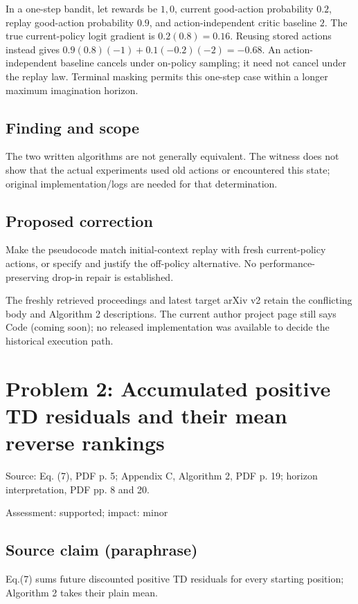 \documentclass[11pt]{article}
\begin{document}
In a one-step bandit, let rewards be \(1,0\), current good-action probability \(0.2\), replay good-action probability \(0.9\), and action-independent critic baseline \(2\). The true current-policy logit gradient is \(0.2(0.8)=0.16\). Reusing stored actions instead gives \(0.9(0.8)(-1)+0.1(-0.2)(-2)=-0.68\). An action-independent baseline cancels under on-policy sampling; it need not cancel under the replay law. Terminal masking permits this one-step case within a longer maximum imagination horizon.

\subsection*{Finding and scope}

The two written algorithms are not generally equivalent. The witness does not show that the actual experiments used old actions or encountered this state; original implementation/logs are needed for that determination.

\subsection*{Proposed correction}

Make the pseudocode match initial-context replay with fresh current-policy actions, or specify and justify the off-policy alternative. No performance-preserving drop-in repair is established.

The freshly retrieved proceedings and latest target arXiv v2 retain the conflicting body and Algorithm 2 descriptions. The current author project page still says Code (coming soon); no released implementation was available to decide the historical execution path.

\section*{Problem 2: Accumulated positive TD residuals and their mean reverse rankings}

Source: Eq. (7), PDF p. 5; Appendix C, Algorithm 2, PDF p. 19; horizon interpretation, PDF pp. 8 and 20.

Assessment: supported; impact: minor

\subsection*{Source claim (paraphrase)}

Eq.(7) sums future discounted positive TD residuals for every starting position; Algorithm 2 takes their plain mean.
\end{document}
